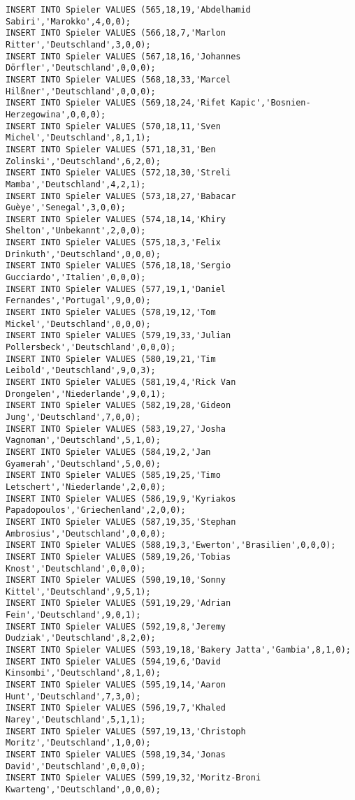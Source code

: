 \documentclass{bschlangaul-aufgabe}
\begin{document}
\begin{verbatim}
INSERT INTO Spieler VALUES (565,18,19,'Abdelhamid Sabiri','Marokko',4,0,0);
INSERT INTO Spieler VALUES (566,18,7,'Marlon Ritter','Deutschland',3,0,0);
INSERT INTO Spieler VALUES (567,18,16,'Johannes Dörfler','Deutschland',0,0,0);
INSERT INTO Spieler VALUES (568,18,33,'Marcel Hilßner','Deutschland',0,0,0);
INSERT INTO Spieler VALUES (569,18,24,'Rifet Kapic','Bosnien-Herzegowina',0,0,0);
INSERT INTO Spieler VALUES (570,18,11,'Sven Michel','Deutschland',8,1,1);
INSERT INTO Spieler VALUES (571,18,31,'Ben Zolinski','Deutschland',6,2,0);
INSERT INTO Spieler VALUES (572,18,30,'Streli Mamba','Deutschland',4,2,1);
INSERT INTO Spieler VALUES (573,18,27,'Babacar Guèye','Senegal',3,0,0);
INSERT INTO Spieler VALUES (574,18,14,'Khiry Shelton','Unbekannt',2,0,0);
INSERT INTO Spieler VALUES (575,18,3,'Felix Drinkuth','Deutschland',0,0,0);
INSERT INTO Spieler VALUES (576,18,18,'Sergio Gucciardo','Italien',0,0,0);
INSERT INTO Spieler VALUES (577,19,1,'Daniel Fernandes','Portugal',9,0,0);
INSERT INTO Spieler VALUES (578,19,12,'Tom Mickel','Deutschland',0,0,0);
INSERT INTO Spieler VALUES (579,19,33,'Julian Pollersbeck','Deutschland',0,0,0);
INSERT INTO Spieler VALUES (580,19,21,'Tim Leibold','Deutschland',9,0,3);
INSERT INTO Spieler VALUES (581,19,4,'Rick Van Drongelen','Niederlande',9,0,1);
INSERT INTO Spieler VALUES (582,19,28,'Gideon Jung','Deutschland',7,0,0);
INSERT INTO Spieler VALUES (583,19,27,'Josha Vagnoman','Deutschland',5,1,0);
INSERT INTO Spieler VALUES (584,19,2,'Jan Gyamerah','Deutschland',5,0,0);
INSERT INTO Spieler VALUES (585,19,25,'Timo Letschert','Niederlande',2,0,0);
INSERT INTO Spieler VALUES (586,19,9,'Kyriakos Papadopoulos','Griechenland',2,0,0);
INSERT INTO Spieler VALUES (587,19,35,'Stephan Ambrosius','Deutschland',0,0,0);
INSERT INTO Spieler VALUES (588,19,3,'Ewerton','Brasilien',0,0,0);
INSERT INTO Spieler VALUES (589,19,26,'Tobias Knost','Deutschland',0,0,0);
INSERT INTO Spieler VALUES (590,19,10,'Sonny Kittel','Deutschland',9,5,1);
INSERT INTO Spieler VALUES (591,19,29,'Adrian Fein','Deutschland',9,0,1);
INSERT INTO Spieler VALUES (592,19,8,'Jeremy Dudziak','Deutschland',8,2,0);
INSERT INTO Spieler VALUES (593,19,18,'Bakery Jatta','Gambia',8,1,0);
INSERT INTO Spieler VALUES (594,19,6,'David Kinsombi','Deutschland',8,1,0);
INSERT INTO Spieler VALUES (595,19,14,'Aaron Hunt','Deutschland',7,3,0);
INSERT INTO Spieler VALUES (596,19,7,'Khaled Narey','Deutschland',5,1,1);
INSERT INTO Spieler VALUES (597,19,13,'Christoph Moritz','Deutschland',1,0,0);
INSERT INTO Spieler VALUES (598,19,34,'Jonas David','Deutschland',0,0,0);
INSERT INTO Spieler VALUES (599,19,32,'Moritz-Broni Kwarteng','Deutschland',0,0,0);

\end{verbatim}
\end{document}
